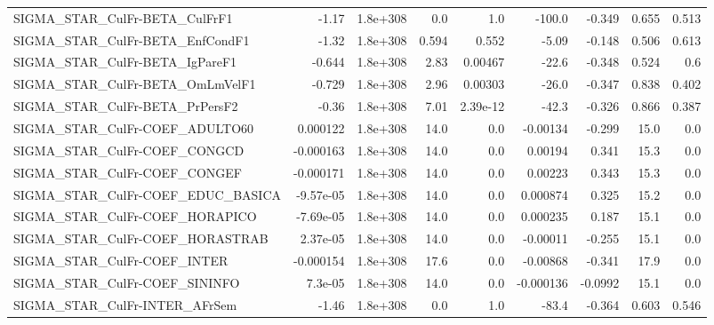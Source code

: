 \begin{tabular}{lrrrrrrrr}
SIGMA\_STAR\_CulFr-BETA\_CulFrF1         &       -1.17 &     1.8e+308 &     0.0 &      1.0 &     -100.0 &      -0.349 &        0.655 &         0.513 \\
SIGMA\_STAR\_CulFr-BETA\_EnfCondF1       &       -1.32 &     1.8e+308 &   0.594 &    0.552 &      -5.09 &      -0.148 &        0.506 &         0.613 \\
SIGMA\_STAR\_CulFr-BETA\_IgPareF1        &      -0.644 &     1.8e+308 &    2.83 &  0.00467 &      -22.6 &      -0.348 &        0.524 &           0.6 \\
SIGMA\_STAR\_CulFr-BETA\_OmLmVelF1       &      -0.729 &     1.8e+308 &    2.96 &  0.00303 &      -26.0 &      -0.347 &        0.838 &         0.402 \\
SIGMA\_STAR\_CulFr-BETA\_PrPersF2        &       -0.36 &     1.8e+308 &    7.01 & 2.39e-12 &      -42.3 &      -0.326 &        0.866 &         0.387 \\
SIGMA\_STAR\_CulFr-COEF\_ADULTO60        &    0.000122 &     1.8e+308 &    14.0 &      0.0 &   -0.00134 &      -0.299 &         15.0 &           0.0 \\
SIGMA\_STAR\_CulFr-COEF\_CONGCD          &   -0.000163 &     1.8e+308 &    14.0 &      0.0 &    0.00194 &       0.341 &         15.3 &           0.0 \\
SIGMA\_STAR\_CulFr-COEF\_CONGEF          &   -0.000171 &     1.8e+308 &    14.0 &      0.0 &    0.00223 &       0.343 &         15.3 &           0.0 \\
SIGMA\_STAR\_CulFr-COEF\_EDUC\_BASICA     &   -9.57e-05 &     1.8e+308 &    14.0 &      0.0 &   0.000874 &       0.325 &         15.2 &           0.0 \\
SIGMA\_STAR\_CulFr-COEF\_HORAPICO        &   -7.69e-05 &     1.8e+308 &    14.0 &      0.0 &   0.000235 &       0.187 &         15.1 &           0.0 \\
SIGMA\_STAR\_CulFr-COEF\_HORASTRAB       &    2.37e-05 &     1.8e+308 &    14.0 &      0.0 &   -0.00011 &      -0.255 &         15.1 &           0.0 \\
SIGMA\_STAR\_CulFr-COEF\_INTER           &   -0.000154 &     1.8e+308 &    17.6 &      0.0 &   -0.00868 &      -0.341 &         17.9 &           0.0 \\
SIGMA\_STAR\_CulFr-COEF\_SININFO         &     7.3e-05 &     1.8e+308 &    14.0 &      0.0 &  -0.000136 &     -0.0992 &         15.1 &           0.0 \\
SIGMA\_STAR\_CulFr-INTER\_AFrSem         &       -1.46 &     1.8e+308 &     0.0 &      1.0 &      -83.4 &      -0.364 &        0.603 &         0.546 \\

\end{tabular}

